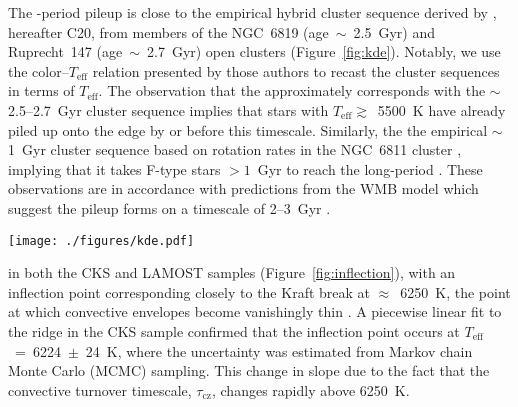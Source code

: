 \documentclass[trackchanges,twocolumn]{aastex631}
\newcommand{\taucz}{$\tau_\mathrm{cz}$\xspace}
\newcommand{\lamostmcq}{LAMOST--McQuillan\xspace}
\newcommand{\teffmin}{5500~K\xspace}
\newcommand{\hall}{H21\xspace}
\newcommand{\curtis}{C20\xspace}
\newcommand{\teff}{\ensuremath{T_{\mathrm{eff}}}\xspace}
\newcommand{\prot}{\ensuremath{P_\mathrm{rot}}\xspace}
\begin{document}
 The -period pileup is close to the empirical hybrid cluster sequence derived by \citet{Curtis2020}, hereafter \curtis, from members of the NGC~6819 (age~$\sim$~2.5~Gyr) and Ruprecht~147 (age~$\sim$~2.7~Gyr) open clusters (Figure~\ref{fig:kde}). Notably, we use the color--\teff relation presented by those authors to recast the cluster sequences in terms of \teff.  The observation that the  approximately corresponds with the $\sim$2.5--2.7~Gyr cluster sequence implies that stars with \teff$\gtrsim$~\teffmin have already piled up onto the edge by or before this timescale. Similarly, the  the empirical $\sim$1~Gyr cluster sequence based on rotation rates in the NGC~6811 cluster \citep{Curtis2019a, Curtis2020}, implying that it takes F-type stars $>1$~Gyr to reach the long-period . These observations are in accordance with predictions from the WMB model which suggest the pileup forms on a timescale of 2--3~Gyr \citep{vanSaders2019}. 

\begin{figure*}
    \centering
    \texttt{[image: ./figures/kde.pdf]}
    \caption{Gaussian kernel density estimation (blue contours) of the \teff--\prot distributions of the CKS--McQuillan, \lamostmcq, and asteroseismic \hall samples, from left to right. Empirical cluster sequences from \curtis are shown by the dark grey lines. The orange dashed lines show constant Rossby curves of fiducial values (see \S\ref{subsec:rossby}). The short-period pileup can be observed in the LAMOST--McQuillan sample for \teff~$\gtrsim$~5500~K. The orange point indicates the Sun's temperature and equatorial rotation period, with the errorbar capturing the range of periods measured from .}
    \label{fig:kde}
\end{figure*}

 in both the CKS and LAMOST samples (Figure~\ref{fig:inflection}), with an inflection point corresponding closely to the Kraft break at $\approx$~6250~K, the point at which convective envelopes become vanishingly thin \citep{Kraft1967}. A piecewise linear fit to the ridge in the CKS sample confirmed that the inflection point occurs at \teff~=~6224~$\pm$~24~K, where the uncertainty was estimated from Markov chain Monte Carlo (MCMC) sampling. This change in slope  due to the fact that the convective turnover timescale, \taucz, changes rapidly above 6250~K.
\end{document}

